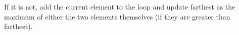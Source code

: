 \documentclass[preview]{standalone}
\begin{document}
If it is not, add the current element to the loop and update farthest as the maximum of either the two elements themselves (if they are greater than farthest).\\
\end{document}
